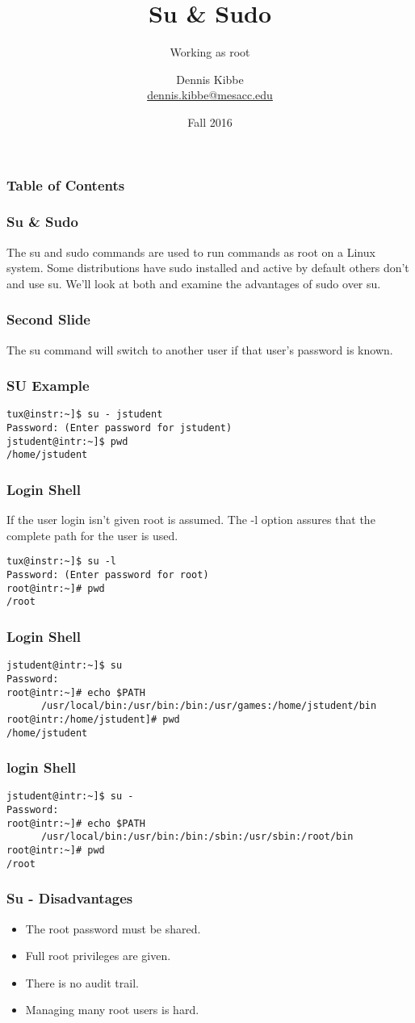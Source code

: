 \documentclass[12pt,handout,aspectratio=169]{beamer}
\title{Su \& Sudo}
\subtitle{Working as root}
\author{Dennis Kibbe\\\href{mailto:dennis.kibbe@mesacc.edu}{dennis.kibbe@mesacc.edu}}
\institute{Mesa Community College\\Network Academy}
\date{Fall 2016}
\begin{document}
\maketitle
\begin{frame}
\frametitle{Table of Contents}
\tableofcontents[currentsection]
\end{frame}
\begin{frame}
\frametitle{Su \& Sudo}
The su and sudo commands are used to run commands as root on a Linux system. Some distributions have sudo installed and active by default others don't and use su.  We'll look at both and examine the advantages of sudo over su.
\end{frame}
\begin{frame}[fragile]
\frametitle{Second Slide}
The su command will switch to another user if that user's password is known.
\end{frame}
\begin{frame}[fragile]
  \frametitle{SU Example}
\begin{verbatim}
tux@instr:~]$ su - jstudent
Password: (Enter password for jstudent)
jstudent@intr:~]$ pwd
/home/jstudent
\end{verbatim}
\end{frame}
\begin{frame}[fragile]
  \frametitle{Login Shell}
If the user login isn't given root is assumed. The -l option assures that the complete path for the user is used.
\begin{verbatim}
tux@instr:~]$ su -l
Password: (Enter password for root)
root@intr:~]# pwd
/root
\end{verbatim}
\end{frame}
\begin{frame}[fragile]
  \frametitle{Login Shell}
\begin{verbatim}
jstudent@intr:~]$ su
Password:
root@intr:~]# echo $PATH
	  /usr/local/bin:/usr/bin:/bin:/usr/games:/home/jstudent/bin
root@intr:/home/jstudent]# pwd
/home/jstudent
\end{verbatim}
\end{frame}
\begin{frame}[fragile]
  \frametitle{login Shell}
\begin{verbatim}
jstudent@intr:~]$ su -
Password:
root@intr:~]# echo $PATH
	  /usr/local/bin:/usr/bin:/bin:/sbin:/usr/sbin:/root/bin
root@intr:~]# pwd
/root
\end{verbatim}
\end{frame}
\begin{frame}
  \frametitle{Su - Disadvantages}
  \begin{itemize}
  \item The root password must be shared.
  \item Full root privileges are given.
  \item There is no audit trail.
  \item Managing many root users is hard.
  \end{itemize}
\end{frame}
\end{document}
